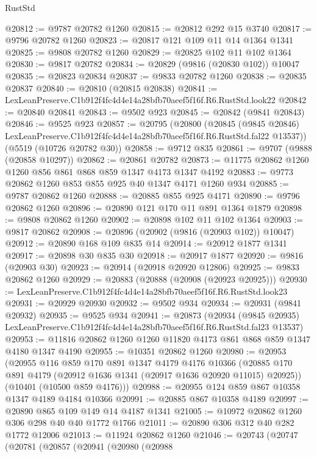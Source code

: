 \begin{lexlean}{RustStd}
\begin{coremodule}
@20812 := @9787 @20782 @1260
@20815 := @20812 @292 @15 @3740
@20817 := @9796 @20782 @1260
@20823 := @20817 @121 @109 @11 @14 @1364 @1341
@20825 := @9808 @20782 @1260
@20829 := @20825 @102 @11 @102 @1364
@20830 := @9817 @20782
@20834 := @20829 (@9816 (@20830 @102)) @10047
@20835 := @20823 @20834
@20837 := @9833 @20782 @1260
@20838 := @20835 @20837
@20840 := @20810 (@20815 @20838)
@20841 := LexLeanPreserve.C1b912f4fc4d4e14a28bfb70aeef5f16f.R6.RustStd.look22
@20842 := @20840 @20841
@20843 := @9502 @923
@20845 := @20842 (@9841 @20843)
@20846 := @9525 @923
@20857 := @20795
    (@20800
      (@20845
        (@9845 @20846)
        LexLeanPreserve.C1b912f4fc4d4e14a28bfb70aeef5f16f.R6.RustStd.fal22
        @13537))
    (@5519 (@10726 @20782 @30))
@20858 := @9712 @835
@20861 := @9707 (@9888 (@20858 @10297))
@20862 := @20861 @20782
@20873 := @11775 @20862 @1260 @1260 @856 @861 @868 @859 @1347 @4173 @1347 @4192
@20883 := @9773 @20862 @1260 @853 @855 @925 @40 @1347 @4171 @1260 @934
@20885 := @9787 @20862 @1260
@20888 := @20885 @855 @925 @4171
@20890 := @9796 @20862 @1260
@20896 := @20890 @121 @170 @11 @891 @1364 @1879
@20898 := @9808 @20862 @1260
@20902 := @20898 @102 @11 @102 @1364
@20903 := @9817 @20862
@20908 := @20896 (@20902 (@9816 (@20903 @102)) @10047)
@20912 := @20890 @168 @109 @835 @14
@20914 := @20912 @1877 @1341
@20917 := @20898 @30 @835 @30
@20918 := @20917 @1877
@20920 := @9816 (@20903 @30)
@20923 := @20914 (@20918 @20920 @12806)
@20925 := @9833 @20862 @1260
@20929 := @20883 (@20888 (@20908 (@20923 @20925)))
@20930 := LexLeanPreserve.C1b912f4fc4d4e14a28bfb70aeef5f16f.R6.RustStd.look23
@20931 := @20929 @20930
@20932 := @9502 @934
@20934 := @20931 (@9841 @20932)
@20935 := @9525 @934
@20941 := @20873
    (@20934
      (@9845 @20935)
      LexLeanPreserve.C1b912f4fc4d4e14a28bfb70aeef5f16f.R6.RustStd.fal23
      @13537)
@20953 := @11816 @20862 @1260 @1260 @11820 @4173 @861 @868 @859 @1347 @4180 @1347 @4190
@20955 := @10351 @20862 @1260
@20980 := @20953
    (@20955
      @116
      @859
      @170
      @891
      @1347
      @4179
      @4176
      @10366
      (@20885 @170 @891 @4179 (@20912 @1636 @1341 (@20917 @1636 @20920 @11015) @20925))
      (@10401 (@10500 @859 @4176)))
@20988 := @20955 @124 @859 @867 @10358 @1347 @4189 @4184 @10366
@20991 := @20885 @867 @10358 @4189
@20997 := @20890 @865 @109 @149 @14 @4187 @1341
@21005 := @10972 @20862 @1260 @306 @298 @40 @40 @1772 @1766
@21011 := @20890 @306 @312 @40 @282 @1772 @12006
@21013 := @11924 @20862 @1260
@21046 := @20743
    (@20747
      (@20781
        (@20857
          (@20941
            (@20980
              (@20988

\end{coremodule}
\end{lexlean}
